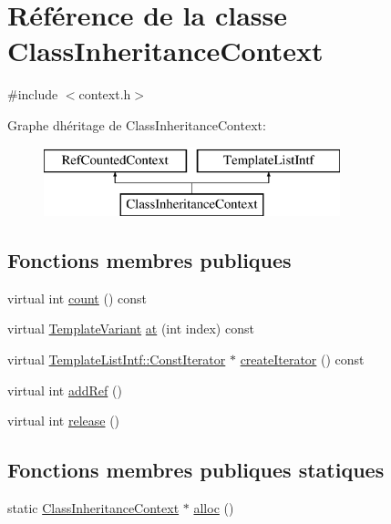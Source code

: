 \hypertarget{class_class_inheritance_context}{}\section{Référence de la classe Class\+Inheritance\+Context}
\label{class_class_inheritance_context}


{\ttfamily \#include $<$context.\+h$>$}

Graphe d\textquotesingle{}héritage de Class\+Inheritance\+Context\+:\begin{figure}[H]
\begin{center}
\leavevmode
\includegraphics[height=2.000000cm]{class_class_inheritance_context}
\end{center}
\end{figure}
\subsection*{Fonctions membres publiques}
\begin{DoxyCompactItemize}
\item 
virtual int \hyperlink{class_class_inheritance_context_ad9650c4d7b06698b927acc329edd3678}{count} () const 
\item 
virtual \hyperlink{class_template_variant}{Template\+Variant} \hyperlink{class_class_inheritance_context_afe1dc54a50a3b49bccac2faa36b778b7}{at} (int index) const 
\item 
virtual \hyperlink{class_template_list_intf_1_1_const_iterator}{Template\+List\+Intf\+::\+Const\+Iterator} $\ast$ \hyperlink{class_class_inheritance_context_a53635676b4569acd9febce0d794829af}{create\+Iterator} () const 
\item 
virtual int \hyperlink{class_class_inheritance_context_add3dd0b40d3bed1b4e48899991dbaf84}{add\+Ref} ()
\item 
virtual int \hyperlink{class_class_inheritance_context_a4570bbdc5944d0c453971ec822106f9e}{release} ()
\end{DoxyCompactItemize}
\subsection*{Fonctions membres publiques statiques}
\begin{DoxyCompactItemize}
\item 
static \hyperlink{class_class_inheritance_context}{Class\+Inheritance\+Context} $\ast$ \hyperlink{class_class_inheritance_context_a5ca3bfb48ae56dfea7f6c39734059099}{alloc} ()
\end{DoxyCompactItemize}


